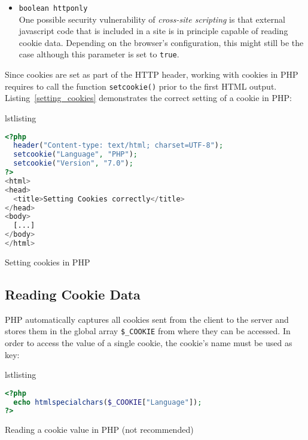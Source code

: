 \documentclass[a4paper, justified, notoc]{tufte-handout} %
\makeatletter
\newenvironment{listing}[1][htbp]
  {\ifvmode\else\unskip\fi\begin{@tufte@float}[#1]{lstlisting}{}}
  {\end{@tufte@float} } %
\makeatother
\begin{document}
\begin{itemize}
	\item \texttt{boolean httponly} \\ One possible security vulnerability of \emph{cross-site scripting} is that external javascript code that is included in a site is in principle capable of reading cookie data. Depending on the browser's configuration, this might still be the case although this parameter is set to \texttt{true}. 
	
\end{itemize}

Since cookies are set as part of the HTTP header, working with cookies in PHP requires to call the function \texttt{setcookie()} prior to the first HTML output. Listing~\ref{setting_cookies} demonstrates the correct setting of a cookie in PHP:


\begin{listing}
\begin{lstlisting}[language=PHP]
<?php
  header("Content-type: text/html; charset=UTF-8");
  setcookie("Language", "PHP");
  setcookie("Version", "7.0");
?>
<html>
<head>
  <title>Setting Cookies correctly</title>
</head>
<body>
  [...]
</body>
</html>
\end{lstlisting}
	\caption{Setting cookies in PHP}
	\label{setting_cookies}
\end{listing}

\subsection{Reading Cookie Data} %
\label{sub:reading_cookie_data}
PHP automatically captures all cookies sent from the client to the server and stores them in the global array \texttt{\$\_COOKIE} from where they can be accessed. 
In order to access the value of a single cookie, the cookie's name must be used as key:
\begin{listing}
\begin{lstlisting}[language=PHP]
<?php
  echo htmlspecialchars($_COOKIE["Language"]);
?>
\end{lstlisting}
	\caption{Reading a cookie value in PHP (not recommended)}
	\label{setting_cookies}
\end{listing}
\end{document}
